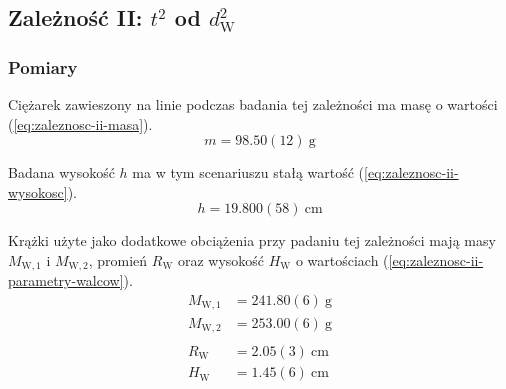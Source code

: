 \documentclass[twocolumn, a4paper, polish, 10pt]{article}
\newcommand{\dwSq}{\ensuremath{ d_{\mathrm{W}}^2 }}
\begin{document}
\subsection{Zależność II: \texorpdfstring{$t^2$}{t²} od \texorpdfstring{$\dwSq$}{dw²}}
\subsubsection{Pomiary}
Ciężarek zawieszony na linie podczas badania tej zależności ma masę o wartości (\ref{eq:zaleznosc-ii-masa}).
\begin{equation}
    m = 98.50(12)~\mathrm{g}
    \label{eq:zaleznosc-ii-masa}
\end{equation}

Badana wysokość $h$ ma w tym scenariuszu stałą wartość (\ref{eq:zaleznosc-ii-wysokosc}).
\begin{equation}
    h = 19.800(58)~\mathrm{cm}
    \label{eq:zaleznosc-ii-wysokosc}
\end{equation}

Krążki użyte jako dodatkowe obciążenia przy padaniu tej zależności mają masy $M_{\mathrm{W,1}}$ i $M_{\mathrm{W,2}}$, promień $R_{\mathrm{W}}$ oraz wysokość $H_{\mathrm{W}}$ o wartościach (\ref{eq:zaleznosc-ii-parametry-walcow}).
\begin{equation}
\begin{split}
    M_{\mathrm{W,1}} &= 241.80(6)~\mathrm{g} \\
    M_{\mathrm{W,2}} &= 253.00(6)~\mathrm{g} \\ \\
    R_{\mathrm{W}}   &= 2.05(3)~\mathrm{cm} \\
    H_{\mathrm{W}}   &= 1.45(6)~\mathrm{cm}
    \label{eq:zaleznosc-ii-parametry-walcow}
\end{split}
\end{equation}
\end{document}

